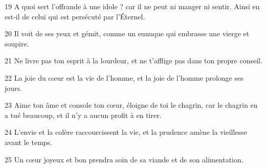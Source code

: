 \par 19 A quoi sert l'offrande à une idole ? car il ne peut ni manger ni sentir. Ainsi en est-il de celui qui est persécuté par l'Éternel.
\par 20 Il voit de ses yeux et gémit, comme un eunuque qui embrasse une vierge et soupire.
\par 21 Ne livre pas ton esprit à la lourdeur, et ne t'afflige pas dans ton propre conseil.
\par 22 La joie du cœur est la vie de l'homme, et la joie de l'homme prolonge ses jours.
\par 23 Aime ton âme et console ton cœur, éloigne de toi le chagrin, car le chagrin en a tué beaucoup, et il n'y a aucun profit à en tirer.
\par 24 L'envie et la colère raccourcissent la vie, et la prudence amène la vieillesse avant le temps.
\par 25 Un cœur joyeux et bon prendra soin de sa viande et de son alimentation.


